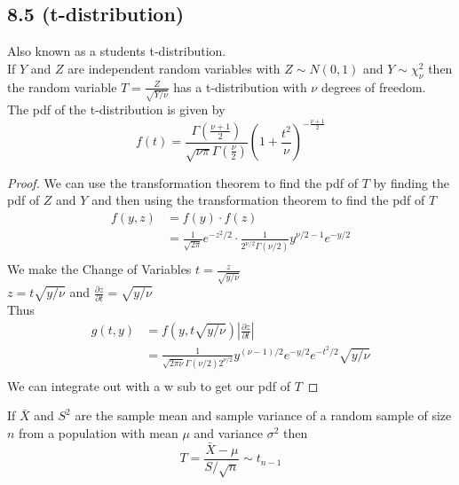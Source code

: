 \documentclass[answers,12pt,addpoints]{exam}
\begin{document}
\subsection{8.5 (t-distribution)}
\begin{definition}[t-distribution]
    Also known as a students t-distribution. \\
    If $Y$ and $Z$ are independent random variables with $Z \sim N(0,1)$ and $Y \sim \chi^2_{\nu}$ then the random variable $T = \frac{Z}{\sqrt{Y/\nu}}$ has a t-distribution with $\nu$ degrees of freedom.\\
    The pdf of the t-distribution is given by
    $$ f(t) = \frac{\Gamma(\frac{\nu + 1}{2})}{\sqrt{\nu \pi} \Gamma(\frac{\nu}{2})} \left( 1 + \frac{t^2}{\nu} \right)^{-\frac{\nu + 1}{2}}$$
    \begin{proof}
        We can use the transformation theorem to find the pdf of $T$ by finding the pdf of $Z$ and $Y$ and then using the transformation theorem to find the pdf of $T$
        \begin{align*}
            f(y,z) &= f(y) \cdot f(z)\\
            &= \frac{1}{\sqrt{2\pi}} e^{-z^2/2} \cdot \frac{1}{2^{\nu/2} \Gamma(\nu/2)} y^{\nu/2 - 1} e^{-y/2} \\
        \end{align*}
        We make the Change of Variables $t = \frac{z}{\sqrt{y/\nu}}$\\
        $z = t \sqrt{y/\nu}$ and $\frac{\partial z}{\partial t} = \sqrt{y/\nu}$\\
        Thus 
        \begin{align*}
            g(t,y) &= f(y,t \sqrt{y/\nu}) \left| \frac{\partial z}{\partial t} \right|\\
            &= \frac{1}{\sqrt{2\pi \nu} \Gamma(\nu/2) 2^{\nu/2} } y^{(\nu-1)/2} e^{-y/2} e^{-t^2/2} \sqrt{y/\nu}\\
        \end{align*}
        We can integrate out with a w sub to get our pdf of $T$
    \end{proof}
    \begin{theorem}
        If $\bar{X}$ and $S^2$ are the sample mean and sample variance of a random sample of size $n$ from a population with mean $\mu$ and variance $\sigma^2$ then
        $$ T = \frac{\bar{X} - \mu}{S/\sqrt{n}} \sim t_{n-1}$$
    \end{theorem}
\end{definition}
\end{document}

